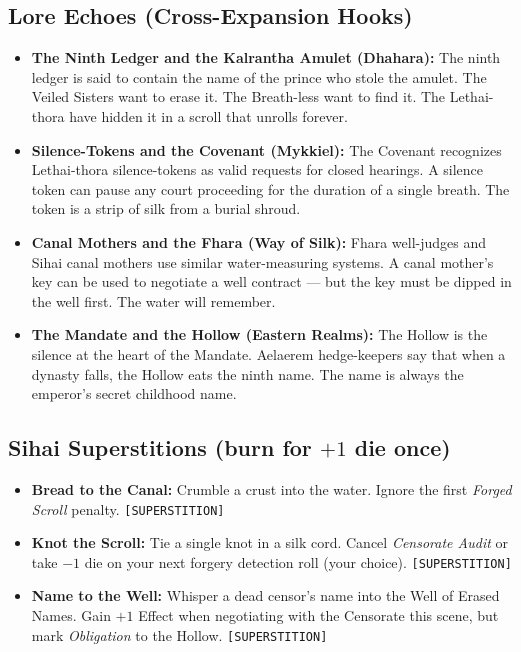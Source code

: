 \subsection*{Lore Echoes (Cross-Expansion Hooks)}
\begin{itemize}
  \item \textbf{The Ninth Ledger and the Kalrantha Amulet (Dhahara):} The ninth ledger is said to contain the name of the prince who stole the amulet. The Veiled Sisters want to erase it. The Breath-less want to find it. The Lethai-thora have hidden it in a scroll that unrolls forever.
  \item \textbf{Silence-Tokens and the Covenant (Mykkiel):} The Covenant recognizes Lethai-thora silence-tokens as valid requests for closed hearings. A silence token can pause any court proceeding for the duration of a single breath. The token is a strip of silk from a burial shroud.
  \item \textbf{Canal Mothers and the Fhara (Way of Silk):} Fhara well-judges and Sihai canal mothers use similar water-measuring systems. A canal mother's key can be used to negotiate a well contract --- but the key must be dipped in the well first. The water will remember.
  \item \textbf{The Mandate and the Hollow (Eastern Realms):} The Hollow is the silence at the heart of the Mandate. Aelaerem hedge-keepers say that when a dynasty falls, the Hollow eats the ninth name. The name is always the emperor's secret childhood name.
\end{itemize}

\subsection*{Sihai Superstitions (burn for $+1$ die once)}
\begin{itemize}
  \item \textbf{Bread to the Canal:} Crumble a crust into the water. Ignore the first \emph{Forged Scroll} penalty. \texttt{[SUPERSTITION]}
  \item \textbf{Knot the Scroll:} Tie a single knot in a silk cord. Cancel \emph{Censorate Audit} or take $-1$ die on your next forgery detection roll (your choice). \texttt{[SUPERSTITION]}
  \item \textbf{Name to the Well:} Whisper a dead censor's name into the Well of Erased Names. Gain $+1$ Effect when negotiating with the Censorate this scene, but mark \emph{Obligation} to the Hollow. \texttt{[SUPERSTITION]}
\end{itemize}

